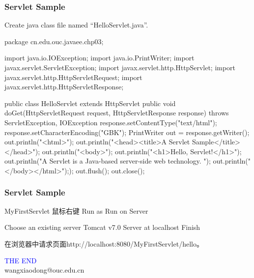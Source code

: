 \begin{frame}[fragile] %
\frametitle{Servlet Sample} 


Create java class file named ``HelloServlet.java''.

\begin{javaCode}
package cn.edu.ouc.javaee.chp03;

import java.io.IOException;
import java.io.PrintWriter;
import javax.servlet.ServletException;
import javax.servlet.http.HttpServlet;
import javax.servlet.http.HttpServletRequest;
import javax.servlet.http.HttpServletResponse;

public class HelloServlet extends HttpServlet {
  public void doGet(HttpServletRequest request, HttpServletResponse response)
  throws ServletException, IOException {
    response.setContentType("text/html");
    response.setCharacterEncoding("GBK");
    PrintWriter out = response.getWriter();
    out.println("<html>");
    out.println("<head><title>A Servlet Sample</title></head>");
    out.println("<body>");
    out.println("<h1>Hello, Servlet!</h1>");
    out.println("A Servlet is a Java-based server-side web technology. ");
    out.println("</body></html>"););
    out.flush();
    out.close();
  }
}
\end{javaCode}
\end{frame}

\begin{frame}[fragile] %
\frametitle{Servlet Sample} 

MyFirstServlet  鼠标右键  Run as  Run on Server

  Choose an existing server  Tomcat v7.0 Server at localhost  Finish

在浏览器中请求页面{\Blue http://localhost:8080/MyFirstServlet/hello}。

\end{frame}
\begin{frame}
\centering
{\Huge \textcolor{blue}{THE END}} \\
\vspace{5mm}
{\Large wangxiaodong@ouc.edu.cn} \\
\end{frame}

